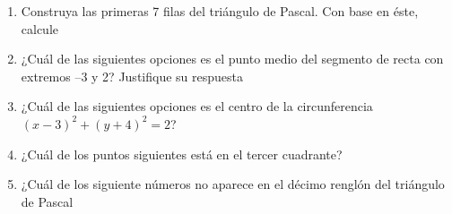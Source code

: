 \documentclass[fleqn]{article}
\begin{document}
\begin{enumerate}
\begin{enumerate}
 \end{enumerate}
 \item Construya las primeras 7 filas del triángulo de Pascal. Con base en éste, calcule \noanswer
 \begin{enumerate}
 \end{enumerate}
 \item ¿Cuál de las siguientes opciones es el punto medio del segmento de recta con extremos --3 y 2? Justifique su respuesta
 \begin{enumerate}
 \end{enumerate}
 \item ¿Cuál de las siguientes opciones es el centro de la circunferencia $(x - 3)^{2}+ (y+4)^{2}=2$?
 \begin{enumerate}
 \end{enumerate}
 \item ¿Cuál de los puntos siguientes está en el tercer cuadrante?
 \begin{enumerate}
 \end{enumerate}
 \item ¿Cuál de los siguiente números no aparece en el décimo renglón del triángulo de Pascal

\end{enumerate}
\end{document}
